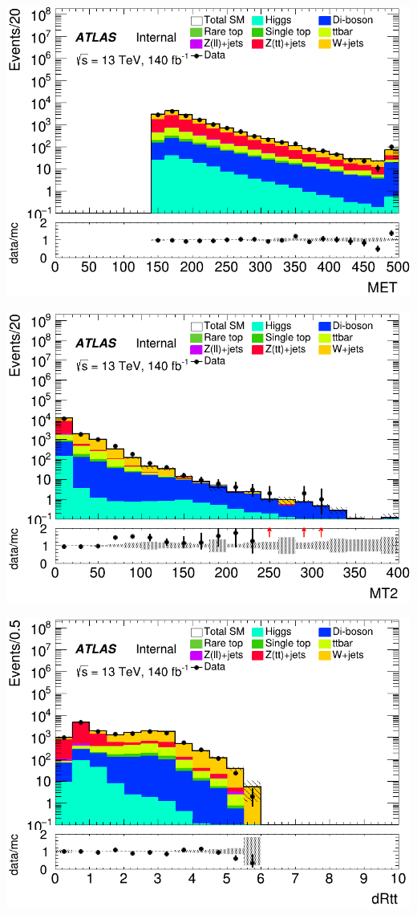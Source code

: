 \documentclass[usenames,dvipsnames]{beamer}
\begin{document}
\begin{frame}
    \begin{minipage}{0.32\textwidth}
        \centering
        \includegraphics[width=\textwidth]{graphics/HH_met/HH_met_MET.png}
    \end{minipage}
    \hfill
    \begin{minipage}{0.32\textwidth}
        \centering
        \includegraphics[width=\textwidth]{graphics/HH_met/HH_met_MT2.png}
    \end{minipage}
    \hfill
    \begin{minipage}{0.32\textwidth}
        \centering
        \includegraphics[width=\textwidth]{graphics/HH_met/HH_met_dRtt.png}

\end{minipage}
\end{frame}
\end{document}
